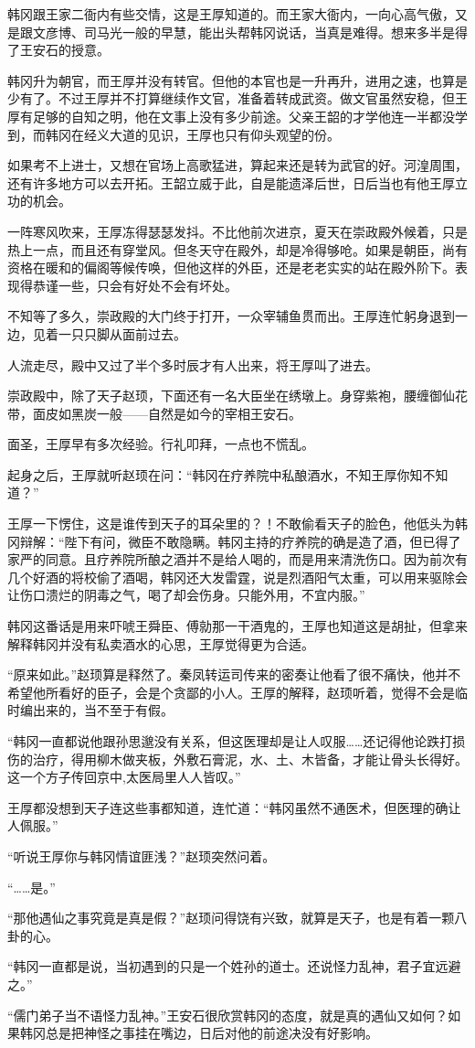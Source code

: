 韩冈跟王家二衙内有些交情，这是王厚知道的。而王家大衙内，一向心高气傲，又是跟文彦博、司马光一般的早慧，能出头帮韩冈说话，当真是难得。想来多半是得了王安石的授意。

韩冈升为朝官，而王厚并没有转官。但他的本官也是一升再升，进用之速，也算是少有了。不过王厚并不打算继续作文官，准备着转成武资。做文官虽然安稳，但王厚有足够的自知之明，他在文事上没有多少前途。父亲王韶的才学他连一半都没学到，而韩冈在经义大道的见识，王厚也只有仰头观望的份。

如果考不上进士，又想在官场上高歌猛进，算起来还是转为武官的好。河湟周围，还有许多地方可以去开拓。王韶立威于此，自是能遗泽后世，日后当也有他王厚立功的机会。

一阵寒风吹来，王厚冻得瑟瑟发抖。不比他前次进京，夏天在崇政殿外候着，只是热上一点，而且还有穿堂风。但冬天守在殿外，却是冷得够呛。如果是朝臣，尚有资格在暖和的偏阁等候传唤，但他这样的外臣，还是老老实实的站在殿外阶下。表现得恭谨一些，只会有好处不会有坏处。

不知等了多久，崇政殿的大门终于打开，一众宰辅鱼贯而出。王厚连忙躬身退到一边，见着一只只脚从面前过去。

人流走尽，殿中又过了半个多时辰才有人出来，将王厚叫了进去。

崇政殿中，除了天子赵顼，下面还有一名大臣坐在绣墩上。身穿紫袍，腰缠御仙花带，面皮如黑炭一般——自然是如今的宰相王安石。

面圣，王厚早有多次经验。行礼叩拜，一点也不慌乱。

起身之后，王厚就听赵顼在问：“韩冈在疗养院中私酿酒水，不知王厚你知不知道？”

王厚一下愣住，这是谁传到天子的耳朵里的？！不敢偷看天子的脸色，他低头为韩冈辩解：“陛下有问，微臣不敢隐瞒。韩冈主持的疗养院的确是造了酒，但已得了家严的同意。且疗养院所酿之酒并不是给人喝的，而是用来清洗伤口。因为前次有几个好酒的将校偷了酒喝，韩冈还大发雷霆，说是烈酒阳气太重，可以用来驱除会让伤口溃烂的阴毒之气，喝了却会伤身。只能外用，不宜内服。”

韩冈这番话是用来吓唬王舜臣、傅勍那一干酒鬼的，王厚也知道这是胡扯，但拿来解释韩冈并没有私卖酒水的心思，王厚觉得更为合适。

“原来如此。”赵顼算是释然了。秦凤转运司传来的密奏让他看了很不痛快，他并不希望他所看好的臣子，会是个贪鄙的小人。王厚的解释，赵顼听着，觉得不会是临时编出来的，当不至于有假。

“韩冈一直都说他跟孙思邈没有关系，但这医理却是让人叹服……还记得他论跌打损伤的治疗，得用柳木做夹板，外敷石膏泥，水、土、木皆备，才能让骨头长得好。这一个方子传回京中,太医局里人人皆叹。”

王厚都没想到天子连这些事都知道，连忙道：“韩冈虽然不通医术，但医理的确让人佩服。”

“听说王厚你与韩冈情谊匪浅？”赵顼突然问着。

“……是。”

“那他遇仙之事究竟是真是假？”赵顼问得饶有兴致，就算是天子，也是有着一颗八卦的心。

“韩冈一直都是说，当初遇到的只是一个姓孙的道士。还说怪力乱神，君子宜远避之。”

“儒门弟子当不语怪力乱神。”王安石很欣赏韩冈的态度，就是真的遇仙又如何？如果韩冈总是把神怪之事挂在嘴边，日后对他的前途决没有好影响。

